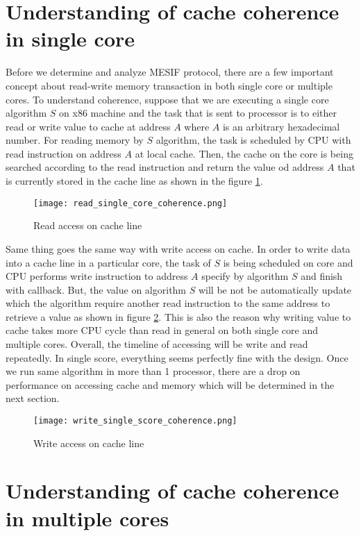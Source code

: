 \section{Understanding of cache coherence in single core}

Before we determine and analyze MESIF protocol, there are a few important concept
about read-write memory transaction in both single core or multiple cores. To understand
coherence, suppose that we are executing a single core algorithm $S$ on x86 machine and the task
that is sent to processor is to either read or write value to cache at address $A$ where $A$ is 
an arbitrary hexadecimal number. For reading memory by $S$ algorithm, the task is scheduled by CPU 
with read instruction on address $A$ at local cache. Then, the cache on the core is being searched according to
the read instruction and return the value od address $A$ that is currently stored in the cache line as shown in the
figure \ref{fig:read_single_core}.
\begin{figure}[h]
        \centering
        \texttt{[image: read\_single\_core\_coherence.png]}
        \caption{\label{fig:read_single_core} Read access on cache line}
\end{figure}

Same thing goes the same way with write access on cache. In order to write data into a cache line in a 
particular core, the task of $S$ is being scheduled on core and CPU performs write instruction to address $A$
specify by algorithm $S$ and finish with callback. But, the value on algorithm $S$ will be not be automatically 
update which the algorithm require another read instruction to the same address to retrieve a value as shown in 
figure \ref{fig:write_single_core}. This is also the reason why writing value to cache takes more CPU cycle than read 
in general on both single core and multiple cores. Overall, the timeline of accessing will be write and read repeatedly. 
In single score, everything seems perfectly fine with the design.
Once we run same algorithm in more than 1 processor, there are a drop on performance on accessing cache and memory which will
be determined in the next section.
\begin{figure}[h]
        \centering
        \texttt{[image: write\_single\_score\_coherence.png]}
        \caption{\label{fig:write_single_core} Write access on cache line}
\end{figure}

\section{Understanding of cache coherence in multiple cores}
